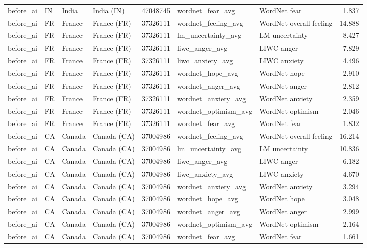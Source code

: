 \begin{tabular}{llllrllr}
before\_ai & IN & India & India (IN) & 47048745 & wordnet\_fear\_avg & WordNet fear & 1.837 \\
before\_ai & FR & France & France (FR) & 37326111 & wordnet\_feeling\_avg & WordNet overall feeling & 14.888 \\
before\_ai & FR & France & France (FR) & 37326111 & lm\_uncertainty\_avg & LM uncertainty & 8.427 \\
before\_ai & FR & France & France (FR) & 37326111 & liwc\_anger\_avg & LIWC anger & 7.829 \\
before\_ai & FR & France & France (FR) & 37326111 & liwc\_anxiety\_avg & LIWC anxiety & 4.496 \\
before\_ai & FR & France & France (FR) & 37326111 & wordnet\_hope\_avg & WordNet hope & 2.910 \\
before\_ai & FR & France & France (FR) & 37326111 & wordnet\_anger\_avg & WordNet anger & 2.812 \\
before\_ai & FR & France & France (FR) & 37326111 & wordnet\_anxiety\_avg & WordNet anxiety & 2.359 \\
before\_ai & FR & France & France (FR) & 37326111 & wordnet\_optimism\_avg & WordNet optimism & 2.046 \\
before\_ai & FR & France & France (FR) & 37326111 & wordnet\_fear\_avg & WordNet fear & 1.832 \\
before\_ai & CA & Canada & Canada (CA) & 37004986 & wordnet\_feeling\_avg & WordNet overall feeling & 16.214 \\
before\_ai & CA & Canada & Canada (CA) & 37004986 & lm\_uncertainty\_avg & LM uncertainty & 10.836 \\
before\_ai & CA & Canada & Canada (CA) & 37004986 & liwc\_anger\_avg & LIWC anger & 6.182 \\
before\_ai & CA & Canada & Canada (CA) & 37004986 & liwc\_anxiety\_avg & LIWC anxiety & 4.670 \\
before\_ai & CA & Canada & Canada (CA) & 37004986 & wordnet\_anxiety\_avg & WordNet anxiety & 3.294 \\
before\_ai & CA & Canada & Canada (CA) & 37004986 & wordnet\_hope\_avg & WordNet hope & 3.048 \\
before\_ai & CA & Canada & Canada (CA) & 37004986 & wordnet\_anger\_avg & WordNet anger & 2.999 \\
before\_ai & CA & Canada & Canada (CA) & 37004986 & wordnet\_optimism\_avg & WordNet optimism & 2.164 \\
before\_ai & CA & Canada & Canada (CA) & 37004986 & wordnet\_fear\_avg & WordNet fear & 1.661 \\

\end{tabular}
